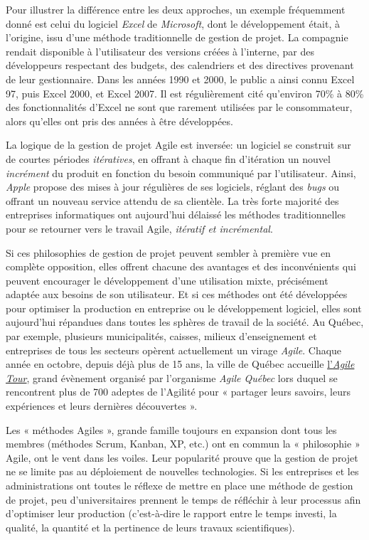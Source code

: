 \documentclass[
  letterpaper,
  DIV=11,
  numbers=noendperiod,
  oneside]{scrreprt}
\begin{document}
Pour illustrer la différence entre les deux approches, un exemple
fréquemment donné est celui du logiciel \emph{Excel} de
\emph{Microsoft}, dont le développement était, à l'origine, issu d'une
méthode traditionnelle de gestion de projet. La compagnie rendait
disponible à l'utilisateur des versions créées à l'interne, par des
développeurs respectant des budgets, des calendriers et des directives
provenant de leur gestionnaire. Dans les années 1990 et 2000, le public
a ainsi connu Excel 97, puis Excel 2000, et Excel 2007. Il est
régulièrement cité qu'environ 70\% à 80\% des fonctionnalités d'Excel ne
sont que rarement utilisées par le consommateur, alors qu'elles ont pris
des années à être développées.

La logique de la gestion de projet Agile est inversée: un logiciel se
construit sur de courtes périodes \emph{itératives}, en offrant à chaque
fin d'itération un nouvel \emph{incrément} du produit en fonction du
besoin communiqué par l'utilisateur. Ainsi, \emph{Apple} propose des
mises à jour régulières de ses logiciels, réglant des \emph{bugs} ou
offrant un nouveau service attendu de sa clientèle. La très forte
majorité des entreprises informatiques ont aujourd'hui délaissé les
méthodes traditionnelles pour se retourner vers le travail Agile,
\emph{itératif et incrémental}.

Si ces philosophies de gestion de projet peuvent sembler à première vue
en complète opposition, elles offrent chacune des avantages et des
inconvénients qui peuvent encourager le développement d'une utilisation
mixte, précisément adaptée aux besoins de son utilisateur. Et si ces
méthodes ont été développées pour optimiser la production en entreprise
ou le développement logiciel, elles sont aujourd'hui répandues dans
toutes les sphères de travail de la société. Au Québec, par exemple,
plusieurs municipalités, caisses, milieux d'enseignement et entreprises
de tous les secteurs opèrent actuellement un virage \emph{Agile}. Chaque
année en octobre, depuis déjà plus de 15 ans, la ville de Québec
accueille \href{https://www.agilequebec.ca/fr/}{l'\emph{Agile Tour}},
grand évènement organisé par l'organisme \emph{Agile Québec} lors duquel
se rencontrent plus de 700 adeptes de l'Agilité pour « partager leurs
savoirs, leurs expériences et leurs dernières découvertes ».

Les « méthodes Agiles », grande famille toujours en expansion dont tous
les membres (méthodes Scrum, Kanban, XP, etc.) ont en commun la «
philosophie » Agile, ont le vent dans les voiles. Leur popularité prouve
que la gestion de projet ne se limite pas au déploiement de nouvelles
technologies. Si les entreprises et les administrations ont toutes le
réflexe de mettre en place une méthode de gestion de projet, peu
d'universitaires prennent le temps de réfléchir à leur processus afin
d'optimiser leur production (c'est-à-dire le rapport entre le temps
investi, la qualité, la quantité et la pertinence de leurs travaux
scientifiques).
\end{document}
